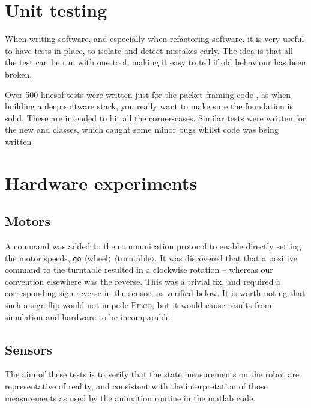 \documentclass[main.tex]{subfiles}
\begin{document}
\section{Unit testing}
	When writing software, and especially when refactoring software, it is very useful to have tests in place, to isolate and detect mistakes early.
	The idea is that all the test can be run with one tool, making it easy to tell if old behaviour has been broken.

	Over 500 lines\footnotemark of tests were written just for the packet framing code \cite{packetio}, as when building a deep software stack, you really want to make sure the foundation is solid. These are intended to hit all the corner-cases.
	Similar tests were written for the new  and  classes, which caught some minor bugs whilst code was being written


\section{Hardware experiments}

	\subsection{Motors}
		A command was added to the communication protocol to enable directly setting the motor speeds, \texttt{go} $\langle$wheel$\rangle$ $\langle$turntable$\rangle$.
		It was discovered that that a positive command to the turntable resulted in a clockwise rotation -- whereas our convention elsewhere was the reverse.
		This was a trivial fix, and required a corresponding sign reverse in the sensor, as verified below.
		It is worth noting that such a sign flip would not impede \textsc{Pilco}, but it would cause results from simulation and hardware to be incomparable.

	\subsection{Sensors}
		The aim of these tests is to verify that the state measurements on the robot are representative of reality, and consistent with the interpretation of those measurements as used by the animation routine in the matlab code\footnotemark.
\end{document}
